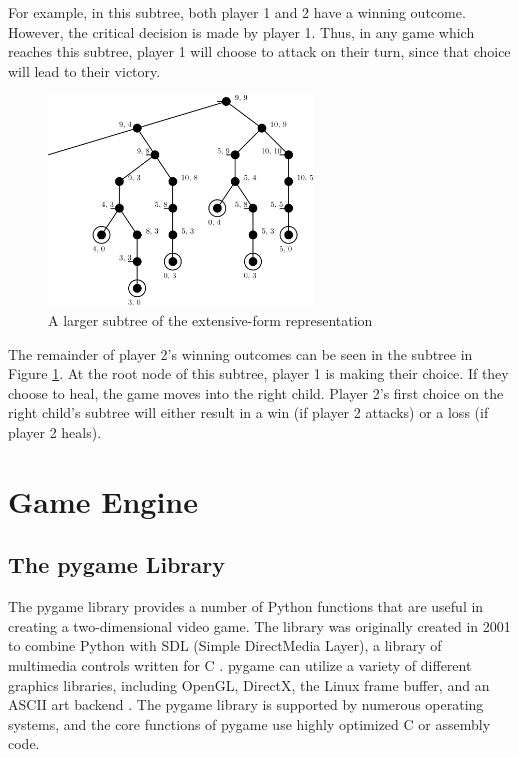 For example, in this subtree, both player 1 and 2 have a winning outcome. However, the critical decision is made by player 1. Thus, in any game which reaches this subtree, player 1 will choose to attack on their turn, since that choice will lead to their victory.\\

\begin{figure}[H]
  \centering
  \includegraphics[width=7cm]{figures/GameSubtree2.png}
  \caption{A larger subtree of the extensive-form representation}
  \label{fig:gameSubtree2}
\end{figure}

The remainder of player 2's winning outcomes can be seen in the subtree in Figure \ref{fig:gameSubtree2}. At the root node of this subtree, player 1 is making their choice. If they choose to heal, the game moves into the right child. Player 2's first choice on the right child's subtree will either result in a win (if player 2 attacks) or a loss (if player 2 heals).

\section{Game Engine}
\subsection{The pygame Library}
The pygame library provides a number of Python functions that are useful in creating a two-dimensional video game. The library was originally created in 2001 to combine Python with SDL (Simple DirectMedia Layer), a library of multimedia controls written for C \cite{shinners}. pygame can utilize a variety of different graphics libraries, including OpenGL, DirectX, the Linux frame buffer, and an ASCII art backend \cite{shinners}. The pygame library is supported by numerous operating systems, and the core functions of pygame use highly optimized C or assembly code.\\

